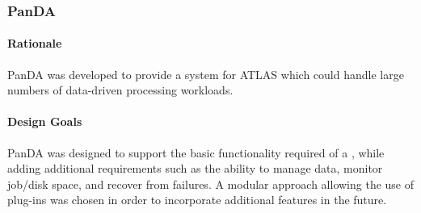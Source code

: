 \documentclass{sig-alternate}
\begin{document}

\subsubsection{PanDA}

\paragraph{Rationale}
PanDA was developed to provide a \pilotjob system for ATLAS which could
handle large numbers of data-driven processing workloads. 

\paragraph{Design Goals}
PanDA was designed to support the basic functionality required of a
\pilotjob, while adding additional requirements such as the ability
to manage data, monitor job/disk space, and recover from failures.
A modular approach allowing the use of plug-ins was chosen in order
to incorporate additional features in the future.
\end{document}
